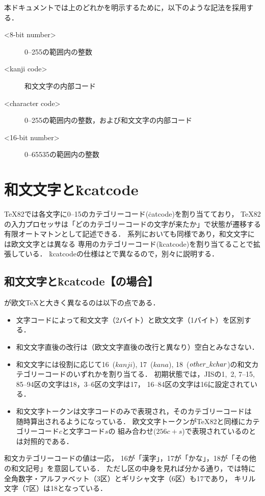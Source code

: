 \documentclass[a4paper,11pt,nomag,dvipdfmx]{jsarticle}
\def\_{\leavevmode\vrule width .45em height -.2ex depth .3ex\relax}
\begin{document}
\medskip

本ドキュメントでは上のどれかを明示するために，以下のような記法を採用する．
\begin{description}
 \item[<8-bit number>] 0--255の範囲内の整数
 \item[<kanji code>] 和文文字の内部コード
 \item[<character code>] 0--255の範囲内の整数，および和文文字の内部コード
 \item[<16-bit number>] 0--65535の範囲内の整数
\end{description}

\section{和文文字と\.{kcatcode}}

\TeX82では各文字に0--15のカテゴリーコード(\.{catcode})を割り当てており，
\TeX82の入力プロセッサは「どのカテゴリーコードの文字が来たか」で状態が遷移する
有限オートマトンとして記述できる\cite{topic}．
\pTeX 系列においても同様であり，和文文字には欧文文字とは異なる
専用のカテゴリーコード(\.{kcatcode})を割り当てることで拡張している．
\.{kcatcode}の仕様は\pTeX と\upTeX で異なるので，別々に説明する．

\subsection{和文文字と\.{kcatcode}【\pTeX の場合】}
\pTeX が欧文\TeX と大きく異なるのは以下の点である．
\begin{itemize}
  \item 文字コードによって和文文字（2バイト）と欧文文字（1バイト）を区別する．
  \item 和文文字直後の改行は（欧文文字直後の改行と異なり）空白とみなさない．
  \item 和文文字には役割に応じて16~($\mathit{kanji}$), 17~($\mathit{kana}$),
    18~($\mathit{other\_kchar}$)の和文カテゴリーコードのいずれかを割り当てる．
    初期状態では，JISの1,~2, 7--15, 85--94区の文字は18，3--6区の文字は17，
    16--84区の文字は16に設定されている．
  \item 和文文字トークンは文字コードのみで表現され，そのカテゴリーコードは
    随時算出されるようになっている．
    欧文文字トークンが\TeX82と同様にカテゴリーコード$c$と文字コード$s$の
    組み合わせ($256c+s$)で表現されているのとは対照的である．
\end{itemize}
和文カテゴリーコードの値は一応，
16が「漢字」，17が「かな」，18が「その他の和文記号」を意図している．
ただし区の中身を見れば分かる通り，\pTeX では特に
全角数字・アルファベット（3区）とギリシャ文字（6区）も17であり，
キリル文字（7区）は18となっている．
\end{document}

